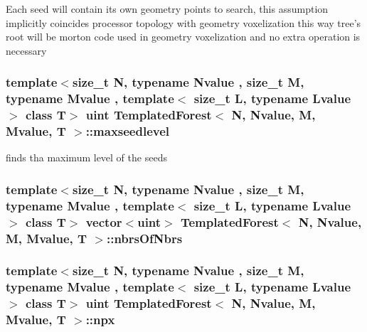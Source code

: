 Each seed will contain its own geometry points to search, this assumption implicitly coincides processor topology with geometry voxelization this way tree's root will be morton code used in geometry voxelization and no extra operation is necessary \hypertarget{classTemplatedForest_ae87d21b2598b557756e71a66379373a9}{
\subsubsection[{maxseedlevel}]{\setlength{\rightskip}{0pt plus 5cm}template$<$size\_\-t N, typename Nvalue , size\_\-t M, typename Mvalue , template$<$ size\_\-t L, typename Lvalue $>$ class T$>$ uint {\bf TemplatedForest}$<$ N, Nvalue, M, Mvalue, T $>$::{\bf maxseedlevel}}}
\label{classTemplatedForest_ae87d21b2598b557756e71a66379373a9}
finds tha maximum level of the seeds \hypertarget{classTemplatedForest_aec4740142a33423f11d38fa4b6a0fa1b}{
\subsubsection[{nbrsOfNbrs}]{\setlength{\rightskip}{0pt plus 5cm}template$<$size\_\-t N, typename Nvalue , size\_\-t M, typename Mvalue , template$<$ size\_\-t L, typename Lvalue $>$ class T$>$ vector$<$uint$>$ {\bf TemplatedForest}$<$ N, Nvalue, M, Mvalue, T $>$::{\bf nbrsOfNbrs}}}
\label{classTemplatedForest_aec4740142a33423f11d38fa4b6a0fa1b}
\hypertarget{classTemplatedForest_a5cf96af68fafcdde214e9125fc3bc8e2}{
\subsubsection[{npx}]{\setlength{\rightskip}{0pt plus 5cm}template$<$size\_\-t N, typename Nvalue , size\_\-t M, typename Mvalue , template$<$ size\_\-t L, typename Lvalue $>$ class T$>$ uint {\bf TemplatedForest}$<$ N, Nvalue, M, Mvalue, T $>$::{\bf npx}}}
\label{classTemplatedForest_a5cf96af68fafcdde214e9125fc3bc8e2}
